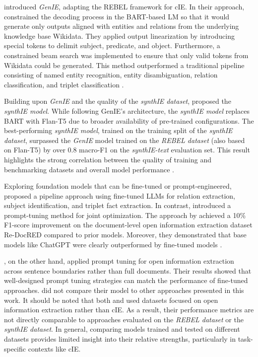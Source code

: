 \documentclass[a4paper,oneside,bibliography=totoc]{scrbook}
\begin{document}
\citet{Josifoski2021} introduced \textit{GenIE}, adapting the REBEL framework for \ac{cIE}. In their approach, \citet{Josifoski2021} constrained the decoding process in the BART-based \ac{LM} so that it would generate only outputs aligned with entities and relations from the underlying knowledge base Wikidata. They applied output linearization by introducing special tokens to delimit subject, predicate, and object. Furthermore, a constrained beam search was implemented to ensure that only valid tokens from Wikidata could be generated. This method outperformed a traditional pipeline consisting of named entity recognition, entity disambiguation, relation classification, and triplet classification \cite{Josifoski2021}.

Building upon \textit{GenIE} and the quality of the \textit{synthIE dataset}, \citet{Josifoski2023} proposed the \textit{synthIE model}. While following GenIE’s architecture, the \textit{synthIE model} replaces BART with Flan-T5 due to broader availability of pre-trained configurations. The best-performing \textit{synthIE model}, trained on the training split of the \textit{synthIE dataset}, surpassed the \textit{GenIE} model trained on the \textit{REBEL dataset} (also based on Flan-T5) by over 0.8 macro-F1 on the \textit{synthIE-text} evaluation set. This result highlights the strong correlation between the quality of training and benchmarking datasets and overall model performance \cite{Josifoski2023}.

Exploring foundation models that can be fine-tuned or prompt-engineered, \citet{Xue2024} proposed a pipeline approach using fine-tuned \acp{LLM} for relation extraction, subject identification, and triplet fact extraction. In contrast, \citet{Chen2024} introduced a prompt-tuning method for joint optimization. The approach by \citet{Xue2024} achieved a 10\% F1-score improvement on the document-level open information extraction dataset Re-DocRED compared to prior models. Moreover, they demonstrated that base models like ChatGPT were clearly outperformed by fine-tuned models \cite{Xue2024}.

\citet{Chen2024}, on the other hand, applied prompt tuning for open information extraction across sentence boundaries rather than full documents. Their results showed that well-designed prompt tuning strategies can match the performance of fine-tuned approaches. \citet{Chen2024} did not compare their model to other approaches presented in this work. It should be noted that both \citet{Chen2024} and \citet{Xue2024} used datasets focused on open information extraction rather than \ac{cIE}. As a result, their performance metrics are not directly comparable to approaches evaluated on the \textit{REBEL dataset} or the \textit{synthIE dataset}. In general, comparing models trained and tested on different datasets provides limited insight into their relative strengths, particularly in task-specific contexts like \ac{cIE}.
\end{document}

